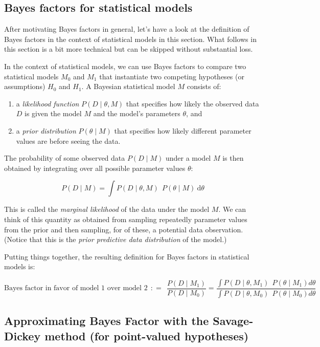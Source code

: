 \documentclass[
  doc,
  floatsintext,
  longtable,
  nolmodern,
  notxfonts,
  notimes,
  colorlinks=true,linkcolor=blue,citecolor=blue,urlcolor=blue]{apa7}
\providecommand{\tightlist}{%
  \setlength{\itemsep}{0pt}\setlength{\parskip}{0pt}}
\begin{document}
\subsection{Bayes factors for statistical
models}\label{bayes-factors-for-statistical-models}

After motivating Bayes factors in general, let's have a look at the
definition of Bayes factors in the context of statistical models in this
section. What follows in this section is a bit more technical but can be
skipped without substantial loss.

In the context of statistical models, we can use Bayes factors to
compare two statistical models \(M_0\) and \(M_1\) that instantiate two
competing hypotheses (or assumptions) \(H_0\) and \(H_1\). A Bayesian
statistical model \(M\) consists of:

\begin{enumerate}
\def\labelenumi{\arabic{enumi}.}
\tightlist
\item
  a \emph{likelihood function} \(P(D \mid \theta, M)\) that specifies
  how likely the observed data \(D\) is given the model \(M\) and the
  model's parameters \(\theta\), and
\item
  a \emph{prior distribution} \(P(\theta \mid M)\) that specifies how
  likely different parameter values are before seeing the data.
\end{enumerate}

The probability of some observed data \(P(D \mid M)\) under a model
\(M\) is then obtained by integrating over all possible parameter values
\(\theta\):

\[
P(D \mid M) = \int P(D \mid \theta, M) \ \  P(\theta \mid M) \ \text{d} \theta
\]

This is called the \emph{marginal likelihood} of the data under the
model \(M\). We can think of this quantity as obtained from sampling
repeatedly parameter values from the prior and then sampling, for of
these, a potential data observation. (Notice that this is the
\emph{prior predictive data distribution} of the model.)

Putting things together, the resulting definition for Bayes factors in
statistical models is:

\[
\text{Bayes factor in favor of model 1 over model 2} \ \  \colon\!= \ \ \frac{P(D \mid M_1)}{P(D \mid M_0)} = \frac{\int P(D \mid \theta, M_1) \ \  P(\theta \mid M_1) d\theta}{\int P(D \mid \theta, M_0) \ \  P(\theta \mid M_0) d\theta}
\]

\subsection{Approximating Bayes Factor with the Savage-Dickey method
(for point-valued
hypotheses)}\label{approximating-bayes-factor-with-the-savage-dickey-method-for-point-valued-hypotheses}
\end{document}
